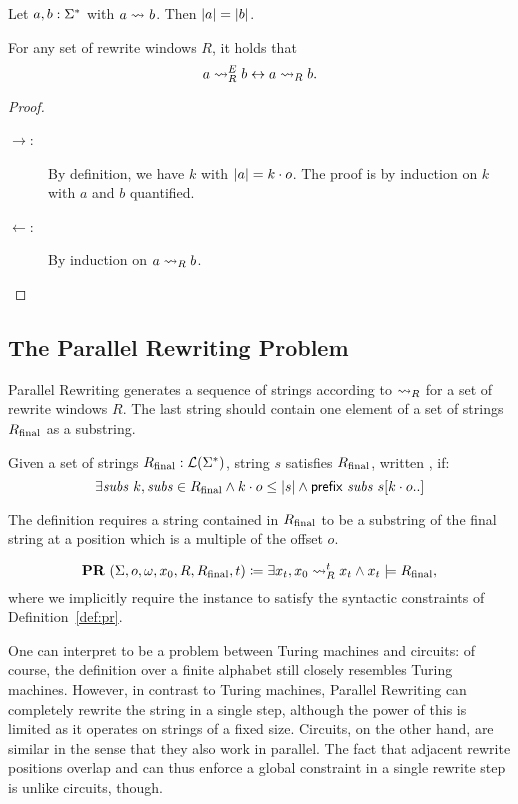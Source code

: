 \begin{proposition}
  Let $a, b : \Sigma^*$ with $a \rightsquigarrow_{} b$. Then $|a| = |b|$. 
\end{proposition}

\begin{lemma}\label{lem:agree_valid}
  For any set of rewrite windows $R$, it holds that 
  \[a \rightsquigarrow_{R}^E b \leftrightarrow a \rightsquigarrow_{R} b. \]
\end{lemma}
\begin{proof}
  \begin{description}
    \item[$\rightarrow$:]
      By definition, we have $k$ with $|a| = k \cdot o$. The proof is by induction on $k$ with $a$ and $b$ quantified.
    \item[$\leftarrow$:]
      By induction on $a \rightsquigarrow_{R} b$. 
  \end{description}
\end{proof}

\subsection{The Parallel Rewriting Problem}
Parallel Rewriting generates a sequence of strings according to $\rightsquigarrow_{R}$ for a set of rewrite windows $R$. The last string should contain one element of a set of strings $R_{\text{final}}$ as a substring.
\begin{definition}
  Given a set of strings $R_{\text{final}} : \mathcal{L} (\Sigma^*)$, string $s$ satisfies $R_{\text{final}}$, written , if:
  \[\exists \mathit{subs}~k, \mathit{subs} \in R_{\text{final}} \land k \cdot o \le |s| \land \textsf{prefix}~\mathit{subs}~s[k \cdot o..] \]
\end{definition}
The definition requires a string contained in $R_{\text{final}}$ to be a substring of the final string at a position which is a multiple of the offset $o$.

\begin{definition}
  \mnote[PRLang]{\PR{}}
  \[\normalfont\textbf{PR}{}~(\Sigma, o, \omega, x_0, R, R_{\text{final}}, t) \coloneqq \exists x_t, x_0 \rightsquigarrow_{R}^t x_t \land x_t \models R_{\text{final}}, \]
  where we implicitly require the instance to satisfy the syntactic constraints of Definition~\ref{def:pr}. 
\end{definition}

One can interpret \PR{} to be a problem between Turing machines and circuits: of course, the definition over a finite alphabet still closely resembles Turing machines. However, in contrast to Turing machines, Parallel Rewriting can completely rewrite the string in a single step, although the power of this is limited as it operates on strings of a fixed size. 
Circuits, on the other hand, are similar in the sense that they also work in parallel. The fact that adjacent rewrite positions overlap and can thus enforce a global constraint in a single rewrite step is unlike circuits, though. 

